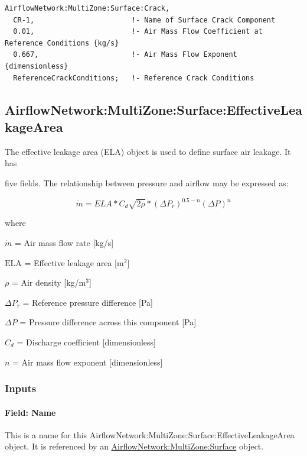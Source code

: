 \begin{lstlisting}
AirflowNetwork:MultiZone:Surface:Crack,
  CR-1,                       !- Name of Surface Crack Component
  0.01,                       !- Air Mass Flow Coefficient at Reference Conditions {kg/s}
  0.667,                      !- Air Mass Flow Exponent {dimensionless}
  ReferenceCrackConditions;   !- Reference Crack Conditions
\end{lstlisting}

\subsection{AirflowNetwork:MultiZone:Surface:EffectiveLeakageArea}\label{airflownetworkmultizonesurfaceeffectiveleakagearea}

The effective leakage area (ELA) object is used to define surface air leakage. It has

five fields. The relationship between pressure and airflow may be expressed as:

\begin{equation}
\dot m = ELA*{C_d}\sqrt {2\rho } *{\left( {\Delta {P_r}} \right)^{0.5 - n}}{\left( {\Delta P} \right)^n}
\end{equation}

where

\(\dot m\) = Air mass flow rate {[}kg/s{]}

\(\mathrm{ELA}\) = Effective leakage area {[}m\(^{2}\){]}

\(\rho\) = Air density {[}kg/m\(^{3}\){]}

\(\Delta {P_r}\) = Reference pressure difference {[}Pa{]}

\(\Delta P\) = Pressure difference across this component {[}Pa{]}

\(C_{d}\) = Discharge coefficient {[}dimensionless{]}

\(n\) = Air mass flow exponent {[}dimensionless{]}

\subsubsection{Inputs}\label{inputs-3-003}

\paragraph{Field: Name}\label{field-name-3-003}

This is a name for this AirflowNetwork:MultiZone:Surface:EffectiveLeakageArea object. It is referenced by an \hyperref[airflownetworkmultizonesurface]{AirflowNetwork:MultiZone:Surface} object.

